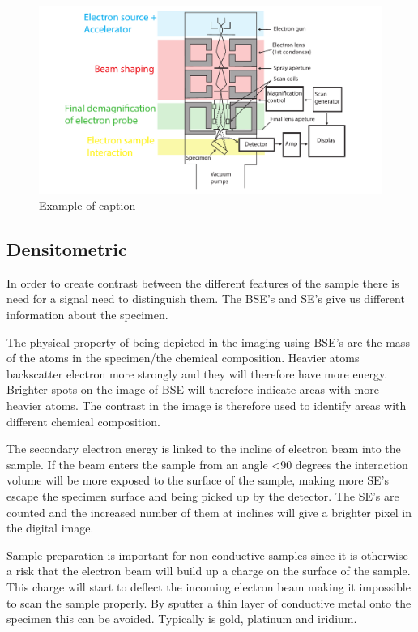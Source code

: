 \begin{figure}[ht!]
\centering
\includegraphics[width=120mm]{figures/Electron_microscopy.pdf}
\caption{Example of caption}
\label{fig:example}
\end{figure}


\subsection*{Densitometric}
In order to create contrast between the different features of the sample there is need for a signal need to distinguish them. The BSE's and SE's give us different information about the specimen.

The physical property of being depicted in the imaging using BSE's are the mass of the atoms in the specimen/the chemical composition. Heavier atoms backscatter electron more strongly and they will therefore have more energy. Brighter spots on the image of BSE will therefore indicate areas with more heavier atoms. The contrast in the image is therefore used to identify areas with different chemical composition.

The secondary electron energy is linked to the incline of electron beam into the sample. If the beam enters the sample from an angle <90 degrees the interaction volume will be more exposed to the surface of the sample, making more SE's escape the specimen surface and being picked up by the detector. The SE's are counted and the increased number of them at inclines will give a brighter pixel in the digital image. 

Sample preparation is important for non-conductive samples since it is otherwise a risk that the electron beam will build up a charge on the surface of the sample. This charge will start to deflect the incoming electron beam making it impossible to scan the sample properly. By sputter a thin layer of conductive metal onto the specimen this can be avoided. Typically is gold, platinum and iridium. 

